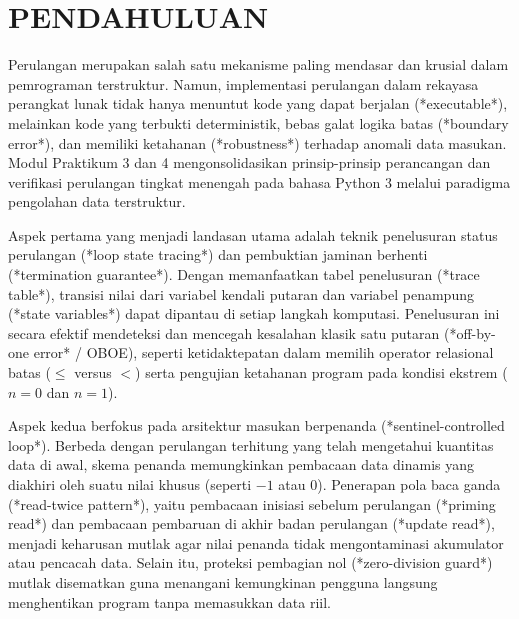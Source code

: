 \documentclass[12pt,a4paper]{article}
\begin{document}
\section{PENDAHULUAN}
Perulangan merupakan salah satu mekanisme paling mendasar dan krusial dalam pemrograman terstruktur. Namun, implementasi perulangan dalam rekayasa perangkat lunak tidak hanya menuntut kode yang dapat berjalan (*executable*), melainkan kode yang terbukti deterministik, bebas galat logika batas (*boundary error*), dan memiliki ketahanan (*robustness*) terhadap anomali data masukan. Modul Praktikum 3 dan 4 mengonsolidasikan prinsip-prinsip perancangan dan verifikasi perulangan tingkat menengah pada bahasa Python 3 melalui paradigma pengolahan data terstruktur.

Aspek pertama yang menjadi landasan utama adalah teknik penelusuran status perulangan (*loop state tracing*) dan pembuktian jaminan berhenti (*termination guarantee*). Dengan memanfaatkan tabel penelusuran (*trace table*), transisi nilai dari variabel kendali putaran dan variabel penampung (*state variables*) dapat dipantau di setiap langkah komputasi. Penelusuran ini secara efektif mendeteksi dan mencegah kesalahan klasik satu putaran (*off-by-one error* / OBOE), seperti ketidaktepatan dalam memilih operator relasional batas ($\le$ versus $<$) serta pengujian ketahanan program pada kondisi ekstrem ($n = 0$ dan $n = 1$).

Aspek kedua berfokus pada arsitektur masukan berpenanda (*sentinel-controlled loop*). Berbeda dengan perulangan terhitung yang telah mengetahui kuantitas data di awal, skema penanda memungkinkan pembacaan data dinamis yang diakhiri oleh suatu nilai khusus (seperti $-1$ atau $0$). Penerapan pola baca ganda (*read-twice pattern*), yaitu pembacaan inisiasi sebelum perulangan (*priming read*) dan pembacaan pembaruan di akhir badan perulangan (*update read*), menjadi keharusan mutlak agar nilai penanda tidak mengontaminasi akumulator atau pencacah data. Selain itu, proteksi pembagian nol (*zero-division guard*) mutlak disematkan guna menangani kemungkinan pengguna langsung menghentikan program tanpa memasukkan data riil.
\end{document}

